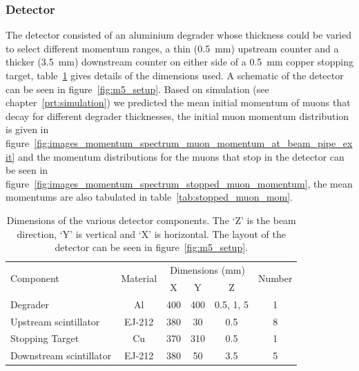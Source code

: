 \subsubsection{Detector} %
\label{sub:detector}
The detector consisted of an aluminium degrader whose thickness could be varied to select different momentum ranges, a thin (0.5~mm) upstream counter and a thicker (3.5~mm) downstream counter on either side of a 0.5~mm copper stopping target, table~\ref{tab:detector_dimensions} gives details of the dimensions used. A schematic of the detector can be seen in figure~\ref{fig:m5_setup}. Based on simulation (see chapter~\ref{prt:simulation}) we predicted the mean initial momentum of muons that decay for different degrader thicknesses, the initial muon momentum distribution is given in figure~\ref{fig:images_momentum_spectrum_muon_momentum_at_beam_pipe_exit} and the momentum distributions for the muons that stop in the detector can be seen in figure~\ref{fig:images_momentum_spectrum_stopped_muon_momentum}, the mean momentums are also tabulated in table~\ref{tab:stopped_muon_mom}.
\begin{table}
  \begin{center}
  \begin{tabular}{l | c | c | c | c | c}
    \multirow{2}{*}{Component}  &  \multirow{2}{*}{Material}  
                                            &  \multicolumn{3}{c|}{Dimensions (mm)}  &  \multirow{2}{*}{Number} \\
                                &           &      X      &      Y     &       Z     &                          \\
    \hline
    Degrader                    &    Al     &     400     &     400    &  0.5, 1, 5  &  1                       \\
    Upstream scintillator       &  EJ-212   &     380     &     30     &      0.5    &  8                       \\    
    Stopping Target             &    Cu     &     370     &     310    &      0.5    &  1                       \\    
    Downstream scintillator     &  EJ-212   &     380     &     50     &      3.5    &  5                       \\    
  \end{tabular}
  \end{center}
  \caption{Dimensions of the various detector components. The `Z' is the beam direction, `Y' is vertical and `X' is horizontal. The layout of the detector can be seen in figure~\ref{fig:m5_setup}.}
  \label{tab:detector_dimensions}
\end{table}


